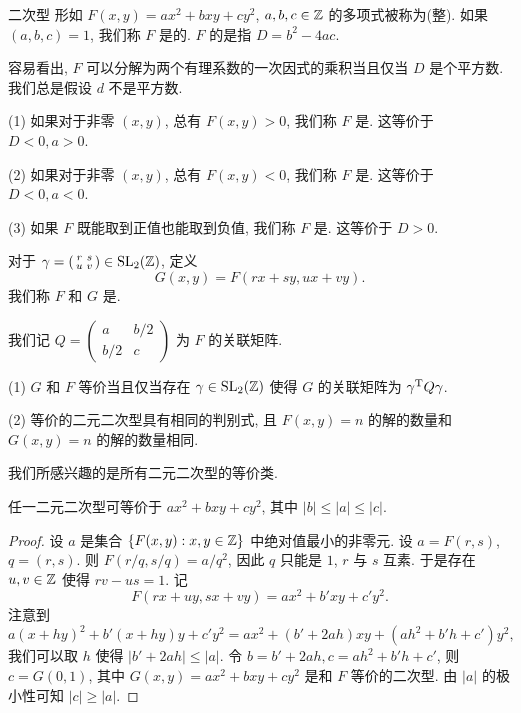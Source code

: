 \begin{definition}{二次型}{}
形如 $F(x,y)=ax^2+bxy+cy^2$, $a,b,c\in{\mathbb{Z}}$ 的多项式被称为(整). 如果 $(a,b,c)=1$, 我们称 $F$ 是的. $F$ 的是指 $D=b^2-4ac$.
\end{definition}


容易看出, $F$ 可以分解为两个有理系数的一次因式的乘积当且仅当 $D$ 是个平方数. 我们总是假设 $d$ 不是平方数.

\begin{definition}{}{}
(1) 如果对于非零 $(x,y)$, 总有 $F(x,y)>0$, 我们称 $F$ 是. 这等价于 $D<0,a>0$.

(2) 如果对于非零 $(x,y)$, 总有 $F(x,y)<0$, 我们称 $F$ 是. 这等价于 $D<0,a<0$.

(3) 如果 $F$ 既能取到正值也能取到负值, 我们称 $F$ 是. 这等价于 $D>0$.
\end{definition}

对于 $\gamma=\left(\begin{smallmatrix}
r&s\\u&v
\end{smallmatrix}\right)
\in{\mathrm{SL}}_2({\mathbb{Z}})$, 定义
	\[G(x,y)=F(rx+sy,ux+vy).\]
我们称 $F$ 和 $G$ 是.

我们记 $Q=\left(\begin{smallmatrix}
a&b/2\\b/2&c
\end{smallmatrix}\right)$ 为 $F$ 的关联矩阵.

\begin{exercise}
(1) $G$ 和 $F$ 等价当且仅当存在 $\gamma\in{\mathrm{SL}}_2({\mathbb{Z}})$ 使得 $G$ 的关联矩阵为 $\gamma^{\mathrm{T}} Q\gamma$.

(2) 等价的二元二次型具有相同的判别式, 且 $F(x,y)=n$ 的解的数量和 $G(x,y)=n$ 的解的数量相同.
\end{exercise}

我们所感兴趣的是所有二元二次型的等价类.

\begin{lemma}{}{}
任一二元二次型可等价于 $ax^2+bxy+cy^2$, 其中 $|b|\le|a|\le |c|$.
\end{lemma}
\begin{proof}
设 $a$ 是集合 $\left\{F(x,y):x,y\in{\mathbb{Z}}\right\}$ 中绝对值最小的非零元. 设 $a=F(r,s)$, $q=(r,s)$. 则 $F(r/q,s/q)=a/q^2$, 因此 $q$ 只能是 $1$, $r$ 与 $s$ 互素. 于是存在 $u,v\in{\mathbb{Z}}$ 使得 $rv-us=1$. 记
	\[F(rx+uy,sx+vy)=ax^2+b'xy+c' y^2.\]
注意到
	\[a(x+hy)^2+b'(x+hy)y+c'y^2=ax^2+(b'+2ah)xy+(ah^2+b'h+c')y^2,\]
我们可以取 $h$ 使得 $|b'+2ah|\le|a|$. 令 $b=b'+2ah,c=ah^2+b'h+c'$, 则 $c=G(0,1)$, 其中 $G(x,y)=ax^2+bxy+cy^2$ 是和 $F$ 等价的二次型. 由 $|a|$ 的极小性可知 $|c|\ge|a|$.
\end{proof}

